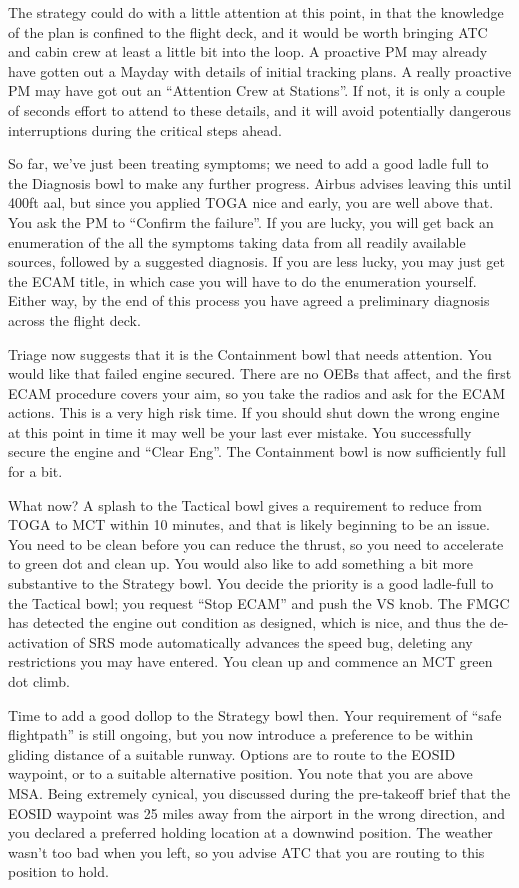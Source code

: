 \documentclass[a5paper,11pt,titlepage]{article} \usepackage[utf8]{inputenc}
\begin{document}
The strategy could do with a little attention at this point, in that the
knowledge of the plan is confined to the flight deck, and it would be
worth bringing ATC and cabin crew at least a little bit into the loop. A
proactive PM may already have gotten out a Mayday with details of
initial tracking plans. A really proactive PM may have got out an
``Attention Crew at Stations''. If not, it is only a couple of seconds
effort to attend to these details, and it will avoid potentially
dangerous interruptions during the critical steps ahead.

So far, we've just been treating symptoms; we need to add a good ladle
full to the Diagnosis bowl to make any further progress. Airbus advises
leaving this until 400ft aal, but since you applied TOGA nice and early,
you are well above that. You ask the PM to ``Confirm the failure''. If
you are lucky, you will get back an enumeration of the all the symptoms
taking data from all readily available sources, followed by a suggested
diagnosis. If you are less lucky, you may just get the ECAM title, in
which case you will have to do the enumeration yourself. Either way, by
the end of this process you have agreed a preliminary diagnosis across
the flight deck.

Triage now suggests that it is the Containment bowl that needs
attention. You would like that failed engine secured. There are no OEBs
that affect, and the first ECAM procedure covers your aim, so you take
the radios and ask for the ECAM actions. This is a very high risk
time. If you should shut down the wrong engine at this point in time it
may well be your last ever mistake. You successfully secure the engine
and ``Clear Eng''. The Containment bowl is now sufficiently full for a
bit.

What now? A splash to the Tactical bowl gives a requirement to reduce
from TOGA to MCT within 10 minutes, and that is likely beginning to be
an issue. You need to be clean before you can reduce the thrust, so you
need to accelerate to green dot and clean up. You would also like to add
something a bit more substantive to the Strategy bowl. You decide the
priority is a good ladle-full to the Tactical bowl; you request ``Stop
ECAM'' and push the VS knob. The FMGC has detected the engine out
condition as designed, which is nice, and thus the de-activation of SRS
mode automatically advances the speed bug, deleting any restrictions you
may have entered. You clean up and commence an MCT green dot climb.

Time to add a good dollop to the Strategy bowl then. Your requirement of
``safe flightpath'' is still ongoing, but you now introduce a preference
to be within gliding distance of a suitable runway. Options are to route
to the EOSID waypoint, or to a suitable alternative position. You note
that you are above MSA. Being extremely cynical, you discussed during
the pre-takeoff brief that the EOSID waypoint was 25 miles away from the
airport in the wrong direction, and you declared a preferred holding
location at a downwind position. The weather wasn't too bad when you
left, so you advise ATC that you are routing to this position to hold.
\end{document}
